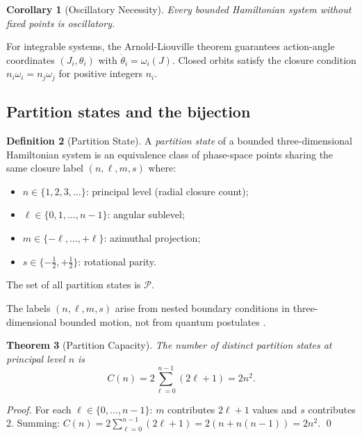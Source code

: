 \documentclass[twocolumn,10pt,a4paper]{article}
\theoremstyle{thmstyle}
\newtheorem{theorem}{Theorem}[section]
\newtheorem{corollary}[theorem]{Corollary}
\theoremstyle{definition}
\newtheorem{definition}[theorem]{Definition}
\theoremstyle{remark}
\newcommand{\Parts}{\mathcal{P}}
\begin{document}
\begin{corollary}[Oscillatory Necessity]
Every bounded Hamiltonian system without fixed points is oscillatory.
\end{corollary}

For integrable systems, the Arnold-Liouville theorem \citep{arnold1989}
guarantees action-angle coordinates $(J_i, \theta_i)$ with
$\dot\theta_i = \omega_i(J)$. Closed orbits satisfy the closure
condition $n_i\omega_i = n_j\omega_j$ for positive integers $n_i$.

\subsection{Partition states and the bijection}

\begin{definition}[Partition State]
\label{def:pstate}
A \emph{partition state} of a bounded three-dimensional Hamiltonian
system is an equivalence class of phase-space points sharing the same
closure label $(n, \ell, m, s)$ where:
\begin{itemize}[nosep]
\item $n \in \{1,2,3,\ldots\}$: principal level (radial closure count);
\item $\ell \in \{0,1,\ldots,n-1\}$: angular sublevel;
\item $m \in \{-\ell,\ldots,+\ell\}$: azimuthal projection;
\item $s \in \{-\tfrac{1}{2}, +\tfrac{1}{2}\}$: rotational parity.
\end{itemize}
The set of all partition states is $\Parts$.
\end{definition}

The labels $(n,\ell,m,s)$ arise from nested boundary conditions in
three-dimensional bounded motion, not from quantum postulates
\citep{andrews1976}.

\begin{theorem}[Partition Capacity]
\label{thm:capacity}
The number of distinct partition states at principal level $n$ is
\begin{equation}
C(n) = 2\sum_{\ell=0}^{n-1}(2\ell+1) = 2n^2.
\label{eq:capacity}
\end{equation}
\end{theorem}

\begin{proof}
For each $\ell \in \{0,\ldots,n-1\}$: $m$ contributes $2\ell+1$ values
and $s$ contributes 2. Summing:
$C(n) = 2\sum_{\ell=0}^{n-1}(2\ell+1) = 2(n + n(n-1)) = 2n^2$.
\qed
\end{proof}
\end{document}
